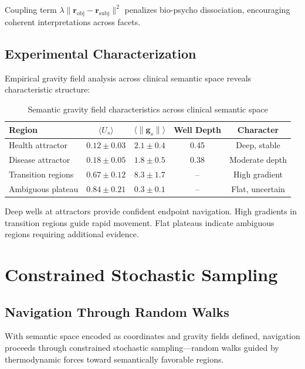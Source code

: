 \documentclass[12pt,a4paper]{article}
\begin{document}
Coupling term $\lambda \|\mathbf{r}_{\text{obj}} - \mathbf{r}_{\text{subj}}\|^2$ penalizes bio-psycho dissociation, encouraging coherent interpretations across facets.

\subsection{Experimental Characterization}

Empirical gravity field analysis across clinical semantic space reveals characteristic structure:

\begin{table}[H]
\centering
\begin{tabular}{lcccc}
\toprule
Region & $\langle U_s \rangle$ & $\langle \|\mathbf{g}_s\| \rangle$ & Well Depth & Character \\
\midrule
Health attractor & $0.12 \pm 0.03$ & $2.1 \pm 0.4$ & 0.45 & Deep, stable \\
Disease attractor & $0.18 \pm 0.05$ & $1.8 \pm 0.5$ & 0.38 & Moderate depth \\
Transition regions & $0.67 \pm 0.12$ & $8.3 \pm 1.7$ & -- & High gradient \\
Ambiguous plateau & $0.84 \pm 0.21$ & $0.3 \pm 0.1$ & -- & Flat, uncertain \\
\bottomrule
\end{tabular}
\caption{Semantic gravity field characteristics across clinical semantic space}
\end{table}

Deep wells at attractors provide confident endpoint navigation. High gradients in transition regions guide rapid movement. Flat plateaus indicate ambiguous regions requiring additional evidence.


\section{Constrained Stochastic Sampling}

\subsection{Navigation Through Random Walks}

With semantic space encoded as coordinates and gravity fields defined, navigation proceeds through constrained stochastic sampling—random walks guided by thermodynamic forces toward semantically favorable regions.
\end{document}
